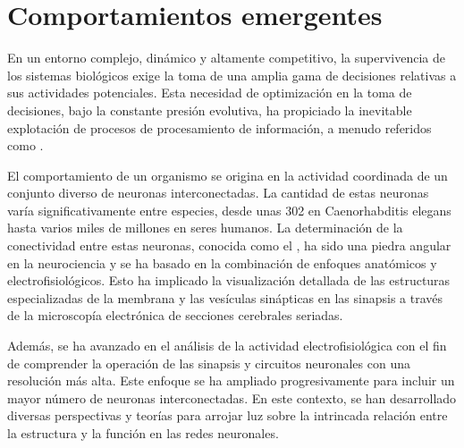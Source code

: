 \chapter{Comportamientos emergentes }\label{cap:modeloneuronal}
\graphicspath{{figs/capitulo_introduccion_robot/}}





En un entorno complejo, dinámico y altamente competitivo, la supervivencia de los sistemas biológicos exige la toma de una amplia gama de decisiones relativas a sus actividades potenciales. Esta necesidad de optimización en la toma de decisiones, bajo la constante presión evolutiva, ha propiciado la inevitable explotación de procesos de procesamiento de información, a menudo referidos como  \cite{baluska_having_2016}. 


El comportamiento de un organismo se origina en la  actividad coordinada de un conjunto diverso de neuronas interconectadas.  La cantidad de estas neuronas varía significativamente entre especies, desde unas 302 en Caenorhabditis elegans hasta varios miles de millones en seres humanos. La determinación de la conectividad entre estas neuronas, conocida como el , ha sido una piedra angular en la neurociencia y se ha basado en la combinación de enfoques anatómicos y electrofisiológicos. Esto ha implicado la visualización detallada de las estructuras especializadas de la membrana y las vesículas sinápticas en las sinapsis a través de la microscopía electrónica de secciones cerebrales seriadas.

Además, se ha avanzado en el análisis de la actividad electrofisiológica con el fin de comprender la operación de las sinapsis y circuitos neuronales con una resolución más alta. Este enfoque se ha ampliado progresivamente para incluir un mayor número de neuronas interconectadas. En este contexto, se han desarrollado diversas perspectivas y teorías para arrojar luz sobre la intrincada relación entre la estructura y la función en las redes neuronales.

